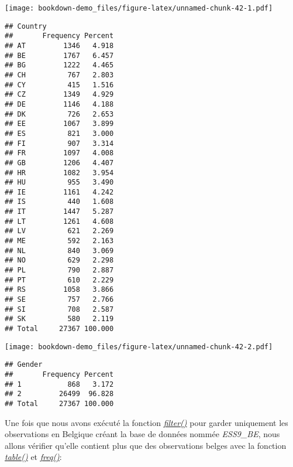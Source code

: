 \documentclass[
]{book}
\newenvironment{Shaded}{\begin{snugshade}}{\end{snugshade}}
\newcommand{\CommentTok}[1]{\textcolor[rgb]{0.56,0.35,0.01}{\textit{#1}}}
\newcommand{\DecValTok}[1]{\textcolor[rgb]{0.00,0.00,0.81}{#1}}
\newcommand{\FunctionTok}[1]{\textcolor[rgb]{0.00,0.00,0.00}{#1}}
\newcommand{\NormalTok}[1]{#1}
\newcommand{\OtherTok}[1]{\textcolor[rgb]{0.56,0.35,0.01}{#1}}
\newcommand{\SpecialCharTok}[1]{\textcolor[rgb]{0.00,0.00,0.00}{#1}}
\newcommand{\StringTok}[1]{\textcolor[rgb]{0.31,0.60,0.02}{#1}}
\begin{document}
\begin{Shaded}
\end{Shaded}

\texttt{[image: bookdown-demo\_files/figure-latex/unnamed-chunk-42-1.pdf]}

\begin{verbatim}
## Country 
##       Frequency Percent
## AT         1346   4.918
## BE         1767   6.457
## BG         1222   4.465
## CH          767   2.803
## CY          415   1.516
## CZ         1349   4.929
## DE         1146   4.188
## DK          726   2.653
## EE         1067   3.899
## ES          821   3.000
## FI          907   3.314
## FR         1097   4.008
## GB         1206   4.407
## HR         1082   3.954
## HU          955   3.490
## IE         1161   4.242
## IS          440   1.608
## IT         1447   5.287
## LT         1261   4.608
## LV          621   2.269
## ME          592   2.163
## NL          840   3.069
## NO          629   2.298
## PL          790   2.887
## PT          610   2.229
## RS         1058   3.866
## SE          757   2.766
## SI          708   2.587
## SK          580   2.119
## Total     27367 100.000
\end{verbatim}

\begin{Shaded}
\end{Shaded}

\texttt{[image: bookdown-demo\_files/figure-latex/unnamed-chunk-42-2.pdf]}

\begin{verbatim}
## Gender 
##       Frequency Percent
## 1           868   3.172
## 2         26499  96.828
## Total     27367 100.000
\end{verbatim}

Une fois que nous avons exécuté la fonction \href{https://dplyr.tidyverse.org/reference/filter.html}{\emph{filter()}} pour garder uniquement les observations en Belgique créant la base de données nommée \emph{ESS9\_BE}, nous allons vérifier qu'elle contient plus que des observations belges avec la fonction \href{https://www.rdocumentation.org/packages/base/versions/3.6.2/topics/table}{\emph{table()}} et \href{https://www.rdocumentation.org/packages/descr/versions/1.1.5/topics/freq}{\emph{freq()}}:
\end{document}
